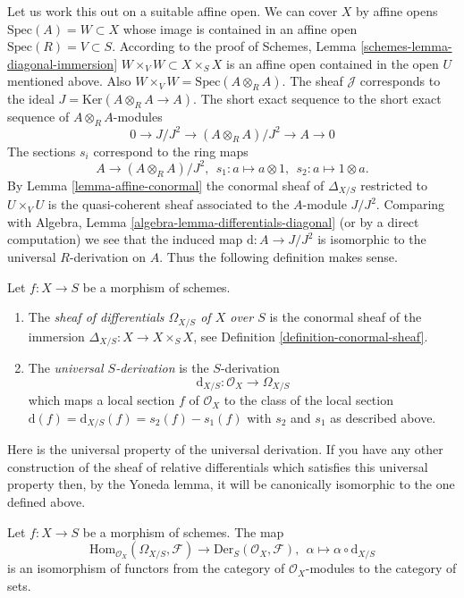 \medskip\noindent
Let us work this out on a suitable affine open.
We can cover $X$ by affine opens $\text{Spec}(A) = W \subset X$
whose image is contained in an affine open $\text{Spec}(R) = V \subset S$.
According to the proof of Schemes, Lemma \ref{schemes-lemma-diagonal-immersion}
$W \times_V W \subset X \times_S X$ is an affine open
contained in the open $U$ mentioned above. Also
$W \times_V W = \text{Spec}(A \otimes_R A)$.
The sheaf $\mathcal{J}$ corresponds to the ideal
$J = \text{Ker}(A \otimes_R A \to A)$.
The short exact sequence to the short exact sequence
of $A \otimes_R A$-modules
$$
0 \to J/J^2 \to (A \otimes_R A)/J^2 \to A \to 0
$$
The sections $s_i$ correspond to the ring maps
$$
A \longrightarrow (A \otimes_R A)/J^2, \ \ 
s_1 : a \mapsto a \otimes 1, \ \ 
s_2 : a \mapsto 1 \otimes a.
$$
By Lemma \ref{lemma-affine-conormal} the conormal sheaf
of $\Delta_{X/S}$ restricted
to $U \times_V U$ is the quasi-coherent sheaf associated to the
$A$-module $J/J^2$. Comparing with
Algebra, Lemma \ref{algebra-lemma-differentials-diagonal}
(or by a direct computation)
we see that the induced map $\text{d} : A \to J/J^2$
is isomorphic to the universal $R$-derivation on $A$.
Thus the following definition makes sense.

\begin{definition}
\label{definition-sheaf-differentials}
Let $f : X \to S$ be a morphism of schemes.
\begin{enumerate}
\item The {\it sheaf of differentials $\Omega_{X/S}$ of $X$ over $S$} is
the conormal sheaf of the immersion $\Delta_{X/S} : X \to X \times_S X$,
see Definition \ref{definition-conormal-sheaf}.
\item The {\it universal $S$-derivation} is the $S$-derivation
$$
\text{d}_{X/S} : \mathcal{O}_X \longrightarrow \Omega_{X/S}
$$
which maps a local section $f$ of $\mathcal{O}_X$ to the class of
the local section $\text{d}(f) = \text{d}_{X/S}(f) = s_2(f) - s_1(f)$ with
$s_2$ and $s_1$ as described above.
\end{enumerate}
\end{definition}

\noindent
Here is the universal property of the universal derivation.
If you have any other construction of the sheaf of relative differentials
which satisfies this universal property then, by the Yoneda lemma,
it will be canonically isomorphic to the one defined above.

\begin{lemma}
\label{lemma-universal-derivation-universal}
Let $f : X \to S$ be a morphism of schemes.
The map
$$
\text{Hom}_{\mathcal{O}_X}(\Omega_{X/S}, \mathcal{F})
\longrightarrow
\text{Der}_S(\mathcal{O}_X, \mathcal{F}), \ \ 
\alpha
\longmapsto
\alpha \circ \text{d}_{X/S}
$$
is an isomorphism of functors
from the category of $\mathcal{O}_X$-modules
to the category of sets.
\end{lemma}

